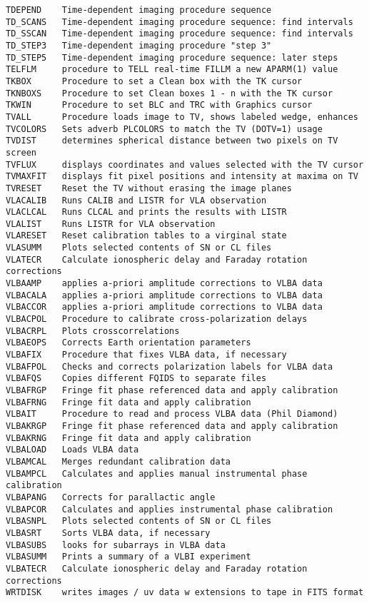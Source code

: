\begin{verbatim}
TDEPEND    Time-dependent imaging procedure sequence
TD_SCANS   Time-dependent imaging procedure sequence: find intervals
TD_SSCAN   Time-dependent imaging procedure sequence: find intervals
TD_STEP3   Time-dependent imaging procedure "step 3"
TD_STEP5   Time-dependent imaging procedure sequence: later steps
TELFLM     procedure to TELL real-time FILLM a new APARM(1) value
TKBOX      Procedure to set a Clean box with the TK cursor
TKNBOXS    Procedure to set Clean boxes 1 - n with the TK cursor
TKWIN      Procedure to set BLC and TRC with Graphics cursor
TVALL      Procedure loads image to TV, shows labeled wedge, enhances
TVCOLORS   Sets adverb PLCOLORS to match the TV (DOTV=1) usage
TVDIST     determines spherical distance between two pixels on TV screen
TVFLUX     displays coordinates and values selected with the TV cursor
TVMAXFIT   displays fit pixel positions and intensity at maxima on TV
TVRESET    Reset the TV without erasing the image planes
VLACALIB   Runs CALIB and LISTR for VLA observation
VLACLCAL   Runs CLCAL and prints the results with LISTR
VLALIST    Runs LISTR for VLA observation
VLARESET   Reset calibration tables to a virginal state
VLASUMM    Plots selected contents of SN or CL files
VLATECR    Calculate ionospheric delay and Faraday rotation corrections
VLBAAMP    applies a-priori amplitude corrections to VLBA data
VLBACALA   applies a-priori amplitude corrections to VLBA data
VLBACCOR   applies a-priori amplitude corrections to VLBA data
VLBACPOL   Procedure to calibrate cross-polarization delays
VLBACRPL   Plots crosscorrelations
VLBAEOPS   Corrects Earth orientation parameters
VLBAFIX    Procedure that fixes VLBA data, if necessary
VLBAFPOL   Checks and corrects polarization labels for VLBA data
VLBAFQS    Copies different FQIDS to separate files
VLBAFRGP   Fringe fit phase referenced data and apply calibration
VLBAFRNG   Fringe fit data and apply calibration
VLBAIT     Procedure to read and process VLBA data (Phil Diamond)
VLBAKRGP   Fringe fit phase referenced data and apply calibration
VLBAKRNG   Fringe fit data and apply calibration
VLBALOAD   Loads VLBA data
VLBAMCAL   Merges redundant calibration data
VLBAMPCL   Calculates and applies manual instrumental phase calibration
VLBAPANG   Corrects for parallactic angle
VLBAPCOR   Calculates and applies instrumental phase calibration
VLBASNPL   Plots selected contents of SN or CL files
VLBASRT    Sorts VLBA data, if necessary
VLBASUBS   looks for subarrays in VLBA data
VLBASUMM   Prints a summary of a VLBI experiment
VLBATECR   Calculate ionospheric delay and Faraday rotation corrections
WRTDISK    writes images / uv data w extensions to tape in FITS format
\end{verbatim}\eve

